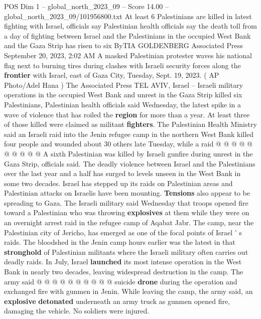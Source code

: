 \begin{textsample}{POS Dim 1 – global\_north\_2023\_09 – Score 14.00 – global\_north\_2023\_09/101956800.txt}  \label{ex:f1_pos_112}
At least 6 Palestinians are killed in latest fighting with Israel, officials say Palestinian health officials say the death toll from a day of fighting between Israel and the Palestinians in the occupied West Bank and the Gaza Strip has risen to six ByTIA GOLDENBERG Associated Press September 20, 2023, 2:02 AM A masked Palestinian protester waves his national flag next to burning tires during clashes with Israeli security forces along the \textbf{frontier} with Israel, east of Gaza City, Tuesday, Sept. 19, 2023. ( AP Photo/Adel Hana ) The Associated Press TEL AVIV, Israel -- Israeli military operations in the occupied West Bank and unrest in the Gaza Strip killed six Palestinians, Palestinian health officials said Wednesday, the latest spike in a wave of violence that has roiled the \textbf{region} for more than a year.
At least three of those killed were claimed as militant \textbf{fighters}.
The Palestinian Health Ministry said an Israeli raid into the Jenin refugee camp in the northern West Bank killed four people and wounded about 30 others late Tuesday, while a raid @ @ @ @ @ @ @ @ @ @ A sixth Palestinian was killed by Israeli gunfire during unrest in the Gaza Strip, officials said.
The deadly violence between Israel and the Palestinians over the last year and a half has surged to levels unseen in the West Bank in some two decades.
Israel has stepped up its raids on Palestinian areas and Palestinian attacks on Israelis have been mounting. \textbf{Tensions} also appear to be spreading to Gaza.
The Israeli military said Wednesday that troops opened fire toward a Palestinian who was throwing \textbf{explosives} at them while they were on an overnight arrest raid in the refugee camp of Aqabat Jabr.
The camp, near the Palestinian city of Jericho, has emerged as one of the focal points of Israel ' s raids.
The bloodshed in the Jenin camp hours earlier was the latest in that \textbf{stronghold} of Palestinian militants where the Israeli military often carries out deadly raids.
In July, Israel \textbf{launched} its most intense operation in the West Bank in nearly two decades, leaving widespread destruction in the camp.
The army said @ @ @ @ @ @ @ @ @ @ suicide \textbf{drone} during the operation and exchanged fire with gunmen in Jenin.
While leaving the camp, the army said, an \textbf{explosive} \textbf{detonated} underneath an army truck as gunmen opened fire, damaging the vehicle.
No soldiers were injured.

\end{textsample}
